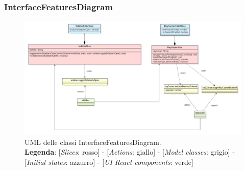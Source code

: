 	\begin{landscape}
		\thispagestyle{empty}
		\subsubsection{InterfaceFeaturesDiagram}
\begin{figure}[H]
	\centering
	\includegraphics[scale=0.75, keepaspectratio]{./res/images/InterfaceFeaturesDiagram.PNG}
	\caption[UML delle classi InterfaceFeaturesDiagram]{
	UML delle classi InterfaceFeaturesDiagram.
	\\
	\textbf{Legenda}: 
	[\textit{Slices}: rosso] -
	[\textit{Actions}: giallo] -
	[\textit{Model classes}: grigio] -
	[\textit{Initial states}: azzurro] -
	[\textit{UI React components}: verde]}
\end{figure}
\end{landscape}
\restoregeometry
